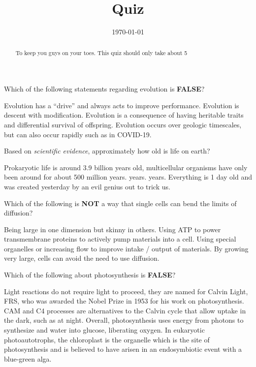 \documentclass[quiz,addpoints,noanswers]{exam}
\title{Quiz}
\date{\today}
\author{\mobeardInstructorShort}
\begin{document}
\maketitle
\begin{abstract}
To keep you guys on your toes. This quiz should only take about \SI{5}{\min}
\end{abstract}

\begin{questions}
\question[1] Which of the following statements regarding evolution is \textbf{FALSE}?
\begin{choices}
\CorrectChoice Evolution has a ``drive'' and always acts to improve performance.
\choice Evolution is descent with modification.
\choice Evolution is a consequence of having heritable traits and differential survival of offspring.
\choice Evolution occurs over geologic timescales, but can also occur rapidly such as in COVID-19.
\end{choices}

\question[1] Based on \emph{scientific evidence}, approximately how old is life on earth?
\begin{choices}
\CorrectChoice Prokaryotic life is around 3.9 billion years old, multicellular organisms have only been around for about 500 million years.
 years.
 years.
\choice Everything is 1 day old and was created yesterday by an evil genius out to trick us. 
\end{choices}

\question[1] Which of the following is \textbf{NOT} a way that single cells can bend the limits of diffusion?
\begin{choices}
\choice Being large in one dimension but skinny in others.
\choice Using ATP to power transmembrane proteins to actively pump materials into a cell.
\choice Using special organelles or increasing flow to improve intake / output of materials. 
\CorrectChoice By growing very large, cells can avoid the need to use diffusion. 
\end{choices}

\question[1] Which of the following about photosynthesis is \textbf{FALSE}?
\begin{choices}
\CorrectChoice Light reactions do not require light to proceed, they are named for Calvin Light, FRS, who was awarded the Nobel Prize in 1953 for his work on photosynthesis.
\choice CAM and C4 processes are alternatives to the Calvin cycle that allow  uptake in the dark, such as at night. 
\choice Overall, photosynthesis uses energy from photons to synthesize  and water into glucose, liberating oxygen. 
\choice In eukaryotic photoautotrophs, the chloroplast is the organelle which is the site of photosynthesis and is believed to have arisen in an endosymbiotic event with a blue-green alga. 
\end{choices}


\end{questions}
\end{document}
